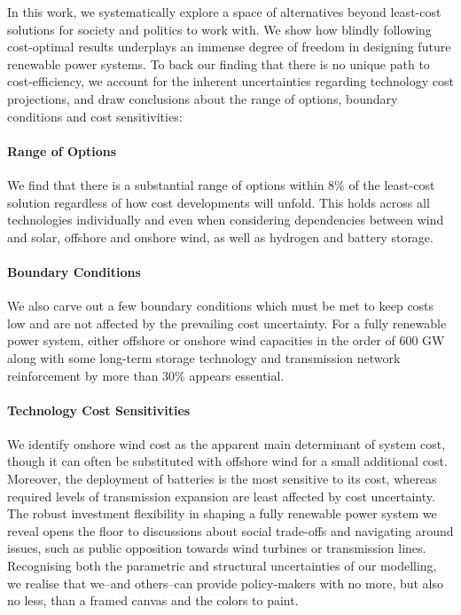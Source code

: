 In this work, we
systematically explore a space of alternatives beyond least-cost solutions
for society and politics to work with.
We show how blindly following cost-optimal results
underplays an immense degree of freedom in designing future renewable power systems.
To back our finding that there is no unique path to cost-efficiency,
we account for the inherent uncertainties regarding technology cost projections,
and draw conclusions about the range of options, boundary conditions and cost sensitivities:

\paragraph{Range of Options}
We find that there is a substantial range of options
within 8\% of the least-cost solution
regardless of how cost developments will unfold.
This holds across all technologies individually
and even when considering dependencies between
wind and solar, offshore and onshore wind, as well as hydrogen and battery storage.

\paragraph{Boundary Conditions}
We also carve out a few boundary conditions which
must be met to keep costs low and are not affected
by the prevailing cost uncertainty.
For a fully renewable power system,
either offshore or onshore wind capacities
in the order of 600 GW
along with some long-term storage technology and
transmission network reinforcement by more than 30\% appears essential.

\paragraph{Technology Cost Sensitivities}
We identify onshore wind cost as the apparent main determinant of system cost,
though it can often be substituted with offshore wind for a small additional cost.
Moreover, the deployment of batteries is the most sensitive to its cost,
whereas required levels of transmission expansion are least affected by cost uncertainty. \\

The robust investment flexibility in shaping a fully renewable power system
we reveal opens the floor to discussions about social trade-offs and navigating
around issues, such as public opposition towards wind turbines or transmission lines.
Recognising both the parametric and structural uncertainties of our modelling,
we realise that we--and others--can provide policy-makers with no more, but also no less,
than a framed canvas and the colors to paint.
